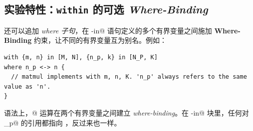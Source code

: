 \subsection*{实验特性：\texttt{within} 的可选 \emph{Where-Binding}}

还可以追加 \emph{where 子句}，在 \co@with-in@ 语句定义的多个有界变量之间施加 \textbf{Where-Binding} 约束，让不同的有界变量互为别名。例如：

\begin{lstlisting}[language=croqtile,caption={实验特性：within 的可选 Where-Binding}]
with {m, n} in [M, N], {n_p, k} in [N_P, K]
where n_p <-> n {
  // matmul implements with m, n, K. 'n_p' always refers to the same value as 'n'.
}
\end{lstlisting}

语法上，\co@<->@ 运算在两个有界变量之间建立 \emph{where-binding}。在 \co@with-in@ 块里，任何对 \co@n_p@ 的引用都指向 \co@n@，反过来也一样。
